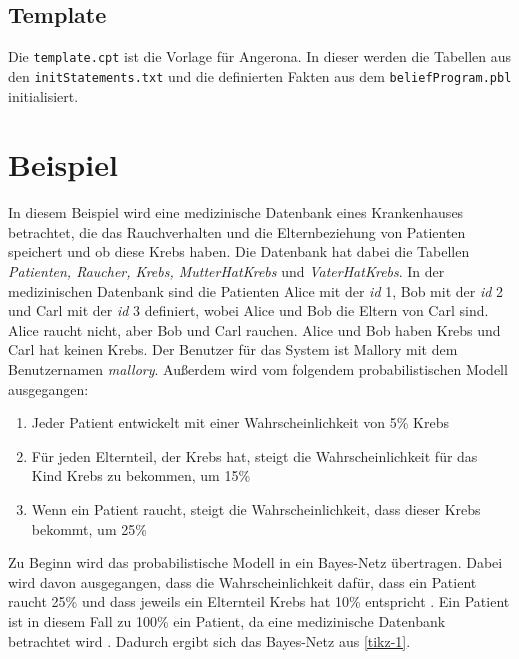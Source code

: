 \documentclass[german,version-2020-11]{uzl-thesis}
\begin{document}
\subsection{Template}
Die \texttt{template.cpt} ist die Vorlage für Angerona. In dieser werden die Tabellen aus den \texttt{initStatements.txt} und die definierten Fakten aus dem \texttt{beliefProgram.pbl} initialisiert.

\section{Beispiel} \label{chap:Beispiel}
In diesem Beispiel wird  eine medizinische Datenbank eines Krankenhauses betrachtet, die das Rauchverhalten und die Elternbeziehung von Patienten speichert und ob diese Krebs haben. Die Datenbank hat dabei die Tabellen \textit{Patienten, Raucher, Krebs, MutterHatKrebs } und \textit{VaterHatKrebs}. In der medizinischen Datenbank sind die Patienten Alice mit der \textit{id} 1, Bob mit der \textit{id} 2 und Carl mit der \textit{id} 3 definiert, wobei Alice und Bob die Eltern von Carl sind. Alice raucht nicht, aber Bob und Carl rauchen. Alice und Bob haben Krebs und Carl hat keinen Krebs. Der Benutzer für das System ist Mallory mit dem Benutzernamen \textit{mallory}. Außerdem wird vom folgendem probabilistischen Modell ausgegangen: 
\begin{enumerate}
\item Jeder Patient entwickelt mit einer Wahrscheinlichkeit von 5\% Krebs
\item Für jeden Elternteil, der Krebs hat, steigt die Wahrscheinlichkeit für das Kind Krebs zu bekommen, um 15\%
\item Wenn ein Patient raucht, steigt die Wahrscheinlichkeit, dass dieser Krebs bekommt, um  25\%
\end{enumerate}
Zu Beginn  wird das probabilistische Modell in ein Bayes-Netz übertragen. Dabei wird davon ausgegangen, dass die Wahrscheinlichkeit dafür, dass ein Patient raucht 25\% und dass jeweils ein Elternteil Krebs hat 10\% entspricht \cite{11}. Ein Patient ist in diesem Fall zu 100\% ein Patient, da eine medizinische Datenbank betrachtet wird \cite{guarnieri2017securing}. Dadurch ergibt sich das Bayes-Netz aus \autoref{tikz-1}.
\end{document}

